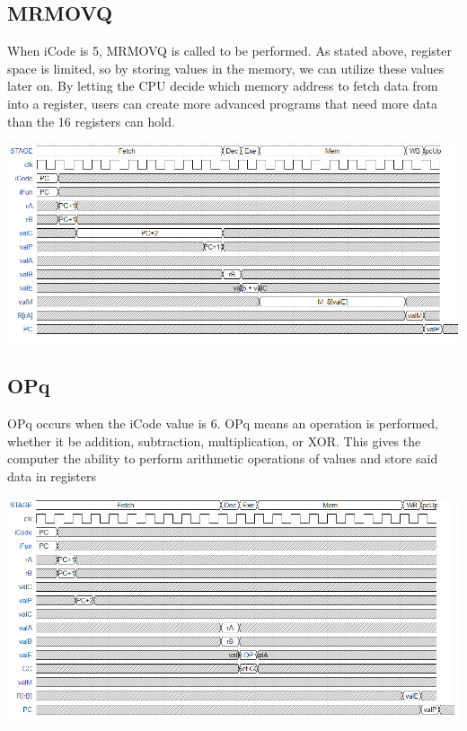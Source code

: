 \documentclass{article}
\begin{document}
\subsection{MRMOVQ}
When iCode is 5, MRMOVQ is called to be performed. As stated above, register space is limited, so by storing values in the memory, we can utilize these values later on. By letting the CPU decide which memory address to fetch data from into a register, users can create more advanced programs that need more data than the 16 registers can hold.
\begin{center}
    \includegraphics[scale=.6]{MRMOVQpic.png}
\end{center}
\pagebreak
\subsection{OPq}
OPq occurs when the iCode value is 6. OPq means an operation is performed, whether it be addition, subtraction, multiplication, or XOR. This gives the computer the ability to perform arithmetic operations of values and store said data in registers
\begin{center}
    \includegraphics[scale=.6]{OPqpic.png}
\end{center}
\end{document}

